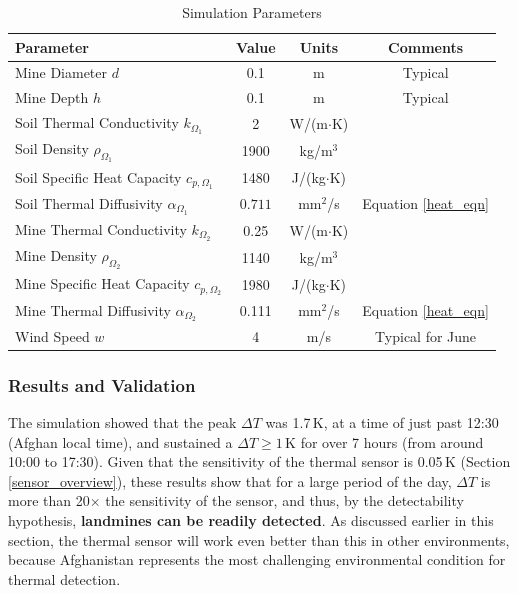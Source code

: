         \begin{table}[ht]
        \centering
        \begin{tabular}{lccc}
        \hline
        \textbf{Parameter} & \textbf{Value} & \textbf{Units} & \textbf{Comments}\\
        \hline
        Mine Diameter \(d\)       & 0.1     & m    & Typical\\
        Mine Depth \(h\)          & 0.1   & m    & Typical\\
        Soil Thermal Conductivity $k_{\Omega_1}$ & 2  & W/(m$\cdot$K) & \cite{szymanik2011soil}\\
        Soil Density $\rho_{\Omega_1}$     & 1900     & kg/m$^3$ & \cite{szymanik2011soil}\\
        Soil Specific Heat Capacity $c_{p,{\Omega_1}}$  & 1480     & J/(kg$\cdot$K) & \cite{szymanik2011soil}\\
        Soil Thermal Diffusivity $\alpha_{\Omega_1}$ & $0.711$ & mm$^2$/s    & Equation \ref{heat_eqn}\\
        Mine Thermal Conductivity $k_{\Omega_2}$ & 0.25  & W/(m$\cdot$K) & \cite{szymanik2011soil}\\
        Mine Density $\rho_{\Omega_2}$      & 1140     & kg/m$^3$ & \cite{szymanik2011soil}\\
        Mine Specific Heat Capacity $c_{p,{\Omega_2}}$ & 1980     & J/(kg$\cdot$K) & \cite{szymanik2011soil}\\
        Mine Thermal Diffusivity $\alpha_{\Omega_2}$ & 0.111 & mm$^2$/s    & Equation \ref{heat_eqn}\\
        Wind Speed \(w\)          & 4      & m/s  & Typical for June \tablefootnote{\url{https://weather-and-climate.com/average-monthly-Wind-speed,Kabul,Afghanistan}}\\
        \hline
        \end{tabular}
        \caption{Simulation Parameters}
        \label{tab:properties}
        \end{table}

   


    \subsubsection{Results and Validation} \label{Results and Validation}
    
         The simulation showed that the peak \(\Delta T\) was 1.7\,K, at a time of just past 12:30 (Afghan local time), and sustained a \(\Delta T \geq 1\)\,K for over 7 hours (from around 10:00 to 17:30). Given that the sensitivity of the thermal sensor is 0.05\,K (Section \ref{sensor_overview}), these results show that for a large period of the day, \(\Delta T\) is more than 20$\times$ the sensitivity of the sensor, and thus, by the detectability hypothesis, \textbf{landmines can be readily detected}. As discussed earlier in this section, the thermal sensor will work even better than this in other environments, because Afghanistan represents the most challenging environmental condition for thermal detection.
    
